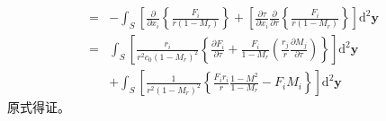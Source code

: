 \begin{enumerate}
\begin{equation}
\begin{aligned}
            =& - \int_{S} \left[\frac{\partial}{\partial x_{i}}\left\{\frac{F_{i}}{r\left(1-M_{r}\right)}\right\}+\left[\frac{\partial \tau}{\partial x_{i}}\right.\right.  \left.\frac{\partial}{\partial \tau}\left\{\frac{F_{i}}{r\left(1-M_{r}\right)}\right\}\right] \mathrm{d}^{2} \mathbf{y} \\
            =& \int_{S}\left[\frac{r_{i}}{r^{2} c_{0}\left(1-M_{r}\right)^{2}}\left\{\frac{\partial F_{i}}{\partial \tau}+\frac{F_{i}}{1-M_{r}}\left(\frac{r_{j}}{r} \frac{\partial M_{j}}{\partial \tau}\right)\right\}\right] \mathrm{d}^{2} \mathbf{y} \\
            &+\int_{S}\left[\frac{1}{r^{2}\left(1-M_{r}\right)^{2}}\left\{\frac{F_{i} r_{i}}{r} \frac{1-M^{2}}{1-M_{r}}-F_{i} M_{i}\right\}\right] \mathrm{d}^{2} \mathbf{y}
        \end{aligned}
    \end{equation}
    原式得证。
\end{enumerate}

\clearpage